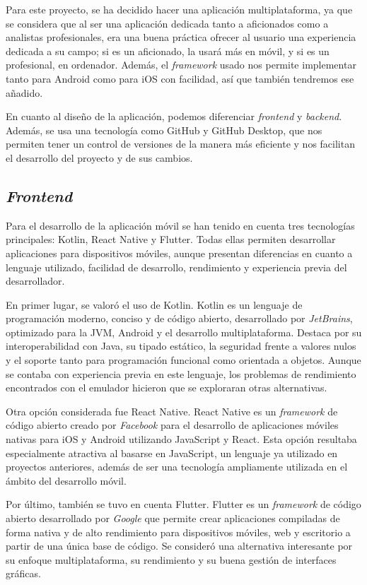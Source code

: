 Para este proyecto, se ha decidido hacer una aplicación multiplataforma, ya que se considera que al ser una aplicación dedicada tanto a aficionados como a analistas profesionales, era una buena práctica ofrecer al usuario una experiencia dedicada a su campo; si es un aficionado, la usará más en móvil, y si es un profesional, en ordenador. Además, el \textit{framework} usado nos permite implementar tanto para Android como para iOS con facilidad, así que también tendremos ese añadido.

En cuanto al diseño de la aplicación, podemos diferenciar \textit{frontend} y \textit{backend}. Además, se usa una tecnología como GitHub y GitHub Desktop, que nos permiten tener un control de versiones de la manera más eficiente y nos facilitan el desarrollo del proyecto y de sus cambios.

\subsection{\textit{Frontend}}

Para el desarrollo de la aplicación móvil se han tenido en cuenta tres tecnologías principales: Kotlin, React Native y Flutter. Todas ellas permiten desarrollar aplicaciones para dispositivos móviles, aunque presentan diferencias en cuanto a lenguaje utilizado, facilidad de desarrollo, rendimiento y experiencia previa del desarrollador.

En primer lugar, se valoró el uso de Kotlin. Kotlin es un lenguaje de programación moderno, conciso y de código abierto, desarrollado por \textit{JetBrains}, optimizado para la JVM, Android y el desarrollo multiplataforma. Destaca por su interoperabilidad con Java, su tipado estático, la seguridad frente a valores nulos y el soporte tanto para programación funcional como orientada a objetos. Aunque se contaba con experiencia previa en este lenguaje, los problemas de rendimiento encontrados con el emulador hicieron que se exploraran otras alternativas.

Otra opción considerada fue React Native. React Native es un \textit{framework} de código abierto creado por \textit{Facebook} para el desarrollo de aplicaciones móviles nativas para iOS y Android utilizando JavaScript y React. Esta opción resultaba especialmente atractiva al basarse en JavaScript, un lenguaje ya utilizado en proyectos anteriores, además de ser una tecnología ampliamente utilizada en el ámbito del desarrollo móvil.

Por último, también se tuvo en cuenta Flutter. Flutter es un \textit{framework} de código abierto desarrollado por \textit{Google} que permite crear aplicaciones compiladas de forma nativa y de alto rendimiento para dispositivos móviles, web y escritorio a partir de una única base de código. Se consideró una alternativa interesante por su enfoque multiplataforma, su rendimiento y su buena gestión de interfaces gráficas.

